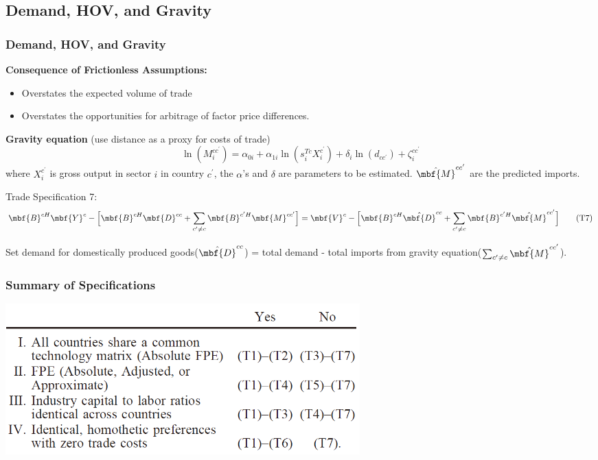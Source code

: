 \documentclass[xcolor=svgnames,10pt]{beamer}
\begin{document}
\subsection{Demand, HOV, and Gravity}
\begin{frame}[c]\frametitle{Demand, HOV, and Gravity}
\textbf{Consequence of Frictionless Assumptions:}
\begin{itemize}
    \item Overstates the expected volume of trade
    \item Overstates the opportunities for arbitrage of factor price differences.
\end{itemize}

\textbf{Gravity equation} (use distance as a proxy for costs of trade)
\begin{equation}
\ln (M_{i}^{cc^{\prime}}) = \alpha_{0i}+\alpha_{1i} \ln(s_{i}^{Tc}X_{i}^{c^{\prime}})+ \delta_{i} \ln(d_{cc^{\prime}})+\zeta_{i}^{cc^{\prime}}
\end{equation}
where $X_{i}^{c^{\prime}}$ is gross output in sector $i$ in country $c^{\prime}$, the $\alpha$\rq{}s and $\delta$ are parameters to be estimated. $\hat{\mbf{M}}^{cc^{\prime}}$ are the predicted imports.

\begin{block}{Trade Specification 7:}
\begin{align}
\mbf{B}^{cH}\mbf{Y}^{c} - \Big[\mbf{B}^{cH}\mbf{D}^{cc}+\sum_{c^{\prime}\not=c}\mbf{B}^{c^{\prime}H}\mbf{M}^{cc^{\prime}}\Big]=\mbf{V}^{c}-\Big[\mbf{B}^{cH}\hat{\mbf{D}}^{cc}+\sum_{c^{\prime}\not = c}\mbf{B}^{c^{\prime}H}\hat{\mbf{M}}^{cc^{\prime}}\Big]\tag{T7}
\end{align}
\end{block}
Set demand for domestically produced goods($\hat{\mbf{D}}^{cc}$) = total demand - total imports from gravity equation($\sum_{c^{\prime}\not = c}\hat{\mbf{M}}^{cc^{\prime}} $).
\end{frame}

\begin{frame}[c]\frametitle{Summary of Specifications}
\begin{center}
\includegraphics[width=0.6\textwidth]{sum.png}
\end{center}
\end{frame}
\end{document}
